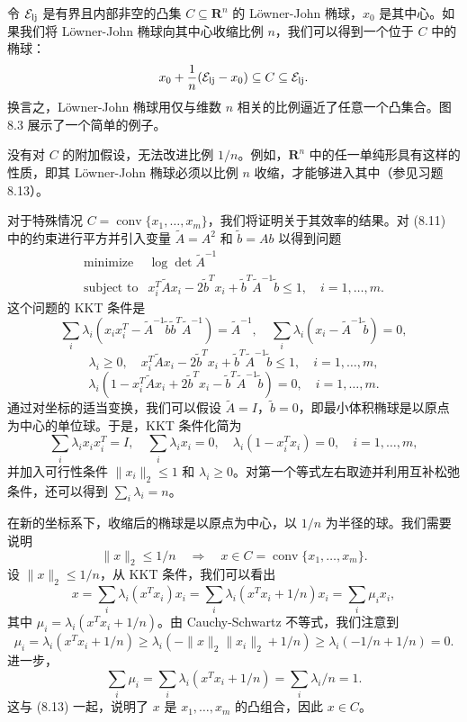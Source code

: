 \documentclass[UTF8,12pt,a4paper,fontset=fandol]{ctexart}
\begin{document}
令 $\mathcal{E}_{\rm lj}$ 是有界且内部非空的凸集 $C\subseteq\mathbf{R}^n$ 的 Löwner-John 椭球，$x_0$ 是其中心。如果我们将 Löwner-John 椭球向其中心收缩比例 $n$，我们可以得到一个位于 $C$ 中的椭球：
\[
x_0+\frac{1}{n}(\mathcal{E}_{\rm lj}-x_0)\subseteq C\subseteq \mathcal{E}_{\rm lj}.
\]
换言之，Löwner-John 椭球用仅与维数 $n$ 相关的比例逼近了任意一个凸集合。图 8.3 展示了一个简单的例子。

没有对 $C$ 的附加假设，无法改进比例 $1/n$。例如，$\mathbf{R}^n$ 中的任一单纯形具有这样的性质，即其 Löwner-John 椭球必须以比例 $n$ 收缩，才能够进入其中（参见习题 8.13）。

对于特殊情况 $C=\operatorname{conv}\{x_1,\ldots,x_m\}$，我们将证明关于其效率的结果。对 (8.11) 中的约束进行平方并引入变量 $\tilde{A}=A^2$ 和 $\tilde{b}=Ab$ 以得到问题
\[
\begin{array}{ll}
\mbox{minimize} & \log\det \tilde{A}^{-1}\\
\mbox{subject to} & x_i^T\tilde{A}x_i-2\tilde{b}^Tx_i+\tilde{b}^T\tilde{A}^{-1}\tilde{b}\leq 1,\quad i=1,\ldots,m.
\end{array}
\tag{8.12}
\]
这个问题的 KKT 条件是
\[
\sum_i \lambda_i(x_i x_i^T-\tilde{A}^{-1}\tilde{b}\tilde{b}^T\tilde{A}^{-1})=\tilde{A}^{-1},\quad
\sum_i \lambda_i(x_i-\tilde{A}^{-1}\tilde{b})=0,
\]
\[
\lambda_i\geq 0,\quad x_i^T\tilde{A}x_i-2\tilde{b}^Tx_i+\tilde{b}^T\tilde{A}^{-1}\tilde{b}\leq 1,\quad i=1,\ldots,m,
\]
\[
\lambda_i(1-x_i^T\tilde{A}x_i+2\tilde{b}^Tx_i-\tilde{b}^T\tilde{A}^{-1}\tilde{b})=0,\quad i=1,\ldots,m.
\]
通过对坐标的适当变换，我们可以假设 $\tilde{A}=I$，$\tilde{b}=0$，即最小体积椭球是以原点为中心的单位球。于是，KKT 条件化简为
\[
\sum_i \lambda_i x_i x_i^T=I,\quad
\sum_i \lambda_i x_i=0,\quad
\lambda_i(1-x_i^Tx_i)=0,\quad i=1,\ldots,m,
\]
并加入可行性条件 $\|x_i\|_2\leq 1$ 和 $\lambda_i\geq 0$。对第一个等式左右取迹并利用互补松弛条件，还可以得到 $\sum_i\lambda_i=n$。

在新的坐标系下，收缩后的椭球是以原点为中心，以 $1/n$ 为半径的球。我们需要说明
\[
\|x\|_2\leq 1/n\quad\Longrightarrow\quad x\in C=\operatorname{conv}\{x_1,\ldots,x_m\}.
\]
设 $\|x\|_2\leq 1/n$，从 KKT 条件，我们可以看出
\[
x=\sum_i \lambda_i(x^Tx_i)x_i
=\sum_i \lambda_i(x^Tx_i+1/n)x_i
=\sum_i \mu_i x_i,
\tag{8.13}
\]
其中 $\mu_i=\lambda_i(x^Tx_i+1/n)$。由 Cauchy-Schwartz 不等式，我们注意到
\[
\mu_i=\lambda_i(x^Tx_i+1/n)\geq
\lambda_i(-\|x\|_2\|x_i\|_2+1/n)\geq
\lambda_i(-1/n+1/n)=0.
\]
进一步，
\[
\sum_i \mu_i=\sum_i\lambda_i(x^Tx_i+1/n)=\sum_i\lambda_i/n=1.
\]
这与 (8.13) 一起，说明了 $x$ 是 $x_1,\ldots,x_m$ 的凸组合，因此 $x\in C$。
\end{document}
